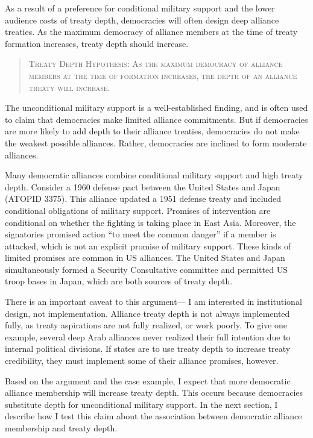\documentclass[12pt]{article}
\begin{document}
As a result of a preference for conditional military support and the lower audience costs of treaty depth, democracies will often design deep alliance treaties. 
As the maximum democracy of alliance members at the time of treaty formation increases, treaty depth should increase. 


\begin{quote}
\textsc{Treaty Depth Hypothesis: As the maximum democracy of alliance members at the time of formation increases, the depth of an alliance treaty will increase.}
\end{quote} 


The unconditional military support is a well-established finding, and is often used to claim that democracies make limited alliance commitments. 
But if democracies are more likely to add depth to their alliance treaties, democracies do not make the weakest possible alliances. 
Rather, democracies are inclined to form moderate alliances. 


Many democratic alliances combine conditional military support and high treaty depth. 
Consider a 1960 defense pact between the United States and Japan (ATOPID 3375).
This alliance updated a 1951 defense treaty and included conditional obligations of military support. 
Promises of intervention are conditional on whether the fighting is taking place in East Asia. 
Moreover, the signatories promised action ``to meet the common danger'' if a member is attacked, which is not an explicit promise of military support. 
These kinds of limited promises are common in US alliances. 
The United States and Japan simultaneously formed a Security Consultative committee and permitted US troop bases in Japan, which are both sources of treaty depth. 


There is an important caveat to this argument--- I am interested in institutional design, not implementation.
Alliance treaty depth is not always implemented fully, as treaty aspirations are not fully realized, or work poorly. 
To give one example, several deep Arab alliances never realized their full intention due to internal political divisions.  
If states are to use treaty depth to increase treaty credibility, they must implement some of their alliance promises, however. 


Based on the argument and the case example, I expect that more democratic alliance membership will increase treaty depth. 
This occurs because democracies substitute depth for unconditional military support. 
In the next section, I describe how I test this claim about the association between democratic alliance membership and treaty depth. 
\end{document}
